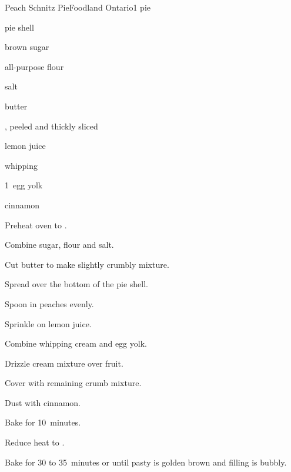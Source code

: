 \begin{recipe}{Peach Schnitz Pie}{Foodland Ontario}{1 pie}

\begin{ingredients}
\item pie shell
\item \C{\twothird} brown sugar
\item {} all-purpose flour
\item salt
\item {} butter
\item {} , peeled and thickly sliced
\item {} lemon juice
\item \C{\quarter} whipping 
\item 1~egg yolk
\item \C{\half} cinnamon
\end{ingredients}

\begin{directions}
\item Preheat oven to .
\item Combine sugar, flour and salt.
\item Cut butter to make slightly crumbly mixture.
\item Spread \third{} over the bottom of the pie shell.
\item Spoon in peaches evenly.
\item Sprinkle on lemon juice.
\item Combine whipping cream and egg yolk.
\item Drizzle cream mixture over fruit.
\item Cover with remaining crumb mixture.
\item Dust with cinnamon.
\item Bake for 10~minutes.
\item Reduce heat to .
\item Bake for 30 to 35~minutes or until pasty is golden brown and filling is bubbly.
\end{directions}

\end{recipe}
